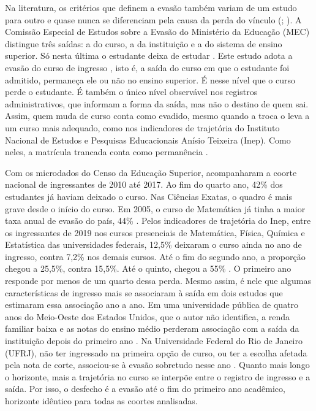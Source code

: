 \documentclass[12pt,a4paper]{article}
\begin{document}
Na literatura, os critérios que definem a evasão também variam de um estudo para outro e quase nunca se diferenciam pela causa da perda do vínculo (\citealp[p.~3]{coimbraEvasaoNaEducacao2021}; \citealp[p.~11]{starkEvasaoNoEnsino2025}). A Comissão Especial de Estudos sobre a Evasão do Ministério da Educação (MEC) distingue três saídas: a do curso, a da instituição e a do sistema de ensino superior. Só nesta última o estudante deixa de estudar \citep{coimbraEvasaoNaEducacao2021}. Este estudo adota a evasão do curso de ingresso \citep{arantesEvasaoRetencaoNo2021}, isto é, a saída do curso em que o estudante foi admitido, permaneça ele ou não no ensino superior. É nesse nível que o curso perde o estudante. É também o único nível observável nos registros administrativos, que informam a forma da saída, mas não o destino de quem sai. Assim, quem muda de curso conta como evadido, mesmo quando a troca o leva a um curso mais adequado, como nos indicadores de trajetória do Instituto Nacional de Estudos e Pesquisas Educacionais Anísio Teixeira (Inep). Como neles, a matrícula trancada conta como permanência \citep{inep2017metodologia}.

Com os microdados do Censo da Educação Superior, \citet{gomesDeterminantesEvasaoNo2024} acompanharam a coorte nacional de ingressantes de 2010 até 2017. Ao fim do quarto ano, 42\% dos estudantes já haviam deixado o curso. Nas Ciências Exatas, o quadro é mais grave desde o início do curso. Em 2005, o curso de Matemática já tinha a maior taxa anual de evasão do país, 44\% \citep{silvafilhoEvasaoNoEnsino2007}. Pelos indicadores de trajetória do Inep, entre os ingressantes de 2019 nos cursos presenciais de Matemática, Física, Química e Estatística das universidades federais, 12,5\% deixaram o curso ainda no ano de ingresso, contra 7,2\% nos demais cursos. Até o fim do segundo ano, a proporção chegou a 25,5\%, contra 15,5\%. Até o quinto, chegou a 55\% \citep{inep2025trajetoria}. O primeiro ano responde por menos de um quarto dessa perda. Mesmo assim, é nele que algumas características de ingresso mais se associaram à saída em dois estudos que estimaram essa associação ano a ano. Em uma universidade pública de quatro anos do Meio-Oeste dos Estados Unidos, que o autor não identifica, a renda familiar baixa e as notas do ensino médio perderam associação com a saída da instituição depois do primeiro ano \citep{ishitani2003longitudinal}. Na Universidade Federal do Rio de Janeiro (UFRJ), não ter ingressado na primeira opção de curso, ou ter a escolha afetada pela nota de corte, associou-se à evasão sobretudo nesse ano \citep{klitzkeFATORESASSOCIADOSEVASAO2023}. Quanto mais longo o horizonte, mais a trajetória no curso se interpõe entre o registro de ingresso e a saída. Por isso, o desfecho é a evasão até o fim do primeiro ano acadêmico, horizonte idêntico para todas as coortes analisadas.
\end{document}
